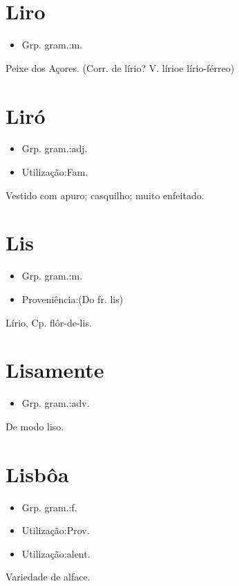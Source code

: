 \section{Liro}
\begin{itemize}
\item {Grp. gram.:m.}
\end{itemize}
Peixe dos Açores.
(Corr. de \textunderscore lírio\textunderscore ? V. \textunderscore lírio\textunderscore  e \textunderscore lírio-férreo\textunderscore )
\section{Liró}
\begin{itemize}
\item {Grp. gram.:adj.}
\end{itemize}
\begin{itemize}
\item {Utilização:Fam.}
\end{itemize}
Vestido com apuro; casquilho; muito enfeitado.
\section{Lis}
\begin{itemize}
\item {Grp. gram.:m.}
\end{itemize}
\begin{itemize}
\item {Proveniência:(Do fr. \textunderscore lis\textunderscore )}
\end{itemize}
Lírio, Cp. \textunderscore flôr-de-lis\textunderscore .
\section{Lisamente}
\begin{itemize}
\item {Grp. gram.:adv.}
\end{itemize}
De modo liso.
\section{Lisbôa}
\begin{itemize}
\item {Grp. gram.:f.}
\end{itemize}
\begin{itemize}
\item {Utilização:Prov.}
\end{itemize}
\begin{itemize}
\item {Utilização:alent.}
\end{itemize}
Variedade de alface.
